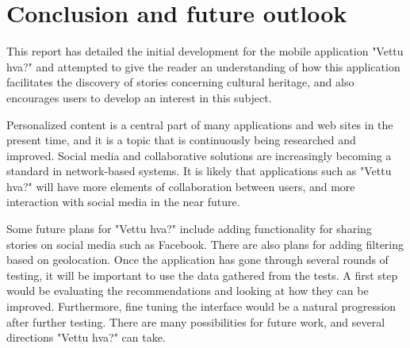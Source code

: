 
\chapter{Conclusion and future outlook}

This report has detailed the initial development for the mobile application "Vettu hva?" and attempted to give the reader an understanding of how this application facilitates the discovery of stories concerning cultural heritage, and also encourages users to develop an interest in this subject.\newline

Personalized content is a central part of many applications and web sites in the present time, and it is a topic that is continuously being researched and improved. Social media and collaborative solutions are increasingly becoming a standard in network-based systems. It is likely that applications such as "Vettu hva?" will have more elements of collaboration between users, and more interaction with social media in the near future.\newline

Some future plans for "Vettu hva?" include adding functionality for sharing stories on social media such as Facebook. There are also plans for adding filtering based on geolocation. Once the application has gone through several rounds of testing, it will be important to use the data gathered from the tests. A first step would be evaluating the recommendations and looking at how they can be improved. Furthermore, fine tuning the interface would be a natural progression after further testing. There are many possibilities for future work, and several directions "Vettu hva?" can take.


\cleardoublepage
